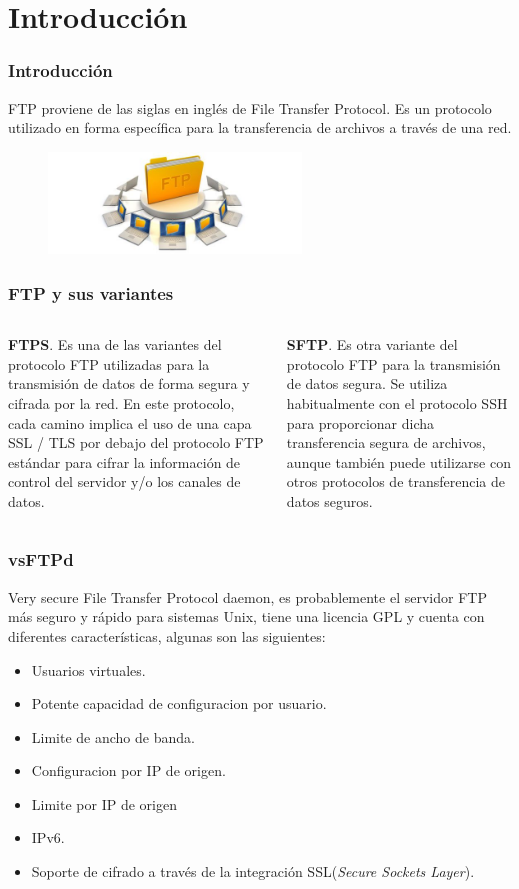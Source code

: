 \section{Introducci\'on}
  \begin{frame}
    \frametitle{Introducci\'on}
    FTP proviene de las siglas en inglés de File Transfer Protocol. Es un protocolo utilizado en forma específica para la transferencia de archivos a través de una red. \\
    \begin{figure}
      \centering
      \includegraphics[width=0.6\textwidth]{./image/ftp-carpetas.jpg}
      \label{fig:ejemplo}
      \end{figure}
  \end{frame}

  \begin{frame}
    \frametitle{FTP y sus variantes}
    \begin{columns}[t]
     {\bf FTPS}. Es una de las variantes del protocolo FTP utilizadas para la transmisión de datos de forma segura y cifrada por la red. En este protocolo, cada camino implica el uso de una capa SSL / TLS por debajo del protocolo FTP estándar para cifrar la información de control del servidor y/o los canales de datos.
     
     {\bf SFTP}. Es otra variante del protocolo FTP para la transmisión de datos segura. Se utiliza habitualmente con el protocolo SSH para proporcionar dicha transferencia segura de archivos, aunque también puede utilizarse con otros protocolos de transferencia de datos seguros.
     \end{columns}
  \end{frame}


  \begin{frame}
    \frametitle{vsFTPd}
    Very secure File Transfer Protocol daemon, es probablemente el servidor FTP m\'as seguro y r\'apido para sistemas Unix, tiene una licencia GPL y cuenta con diferentes caracter\'isticas, algunas son las siguientes:
    \begin{itemize}
    \item Usuarios virtuales.
    \item Potente capacidad de configuracion por usuario.
    \item Limite de ancho de banda.
    \item Configuracion por IP de origen.
    \item Limite por IP de origen
    \item IPv6.
    \item Soporte de cifrado a través de la integración SSL({\em Secure Sockets Layer}).
  	\end{itemize}
  \end{frame}
